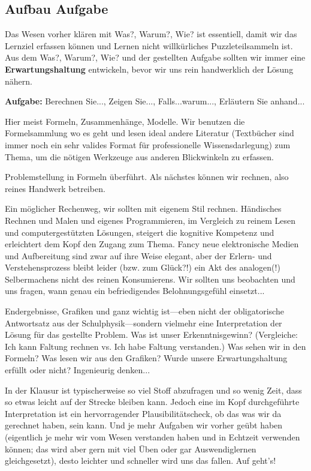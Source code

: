 \subsection*{Aufbau Aufgabe}
\begin{Ziel}
Das Wesen vorher klären mit Was?, Warum?, Wie? ist essentiell, damit wir das
Lernziel erfassen können und Lernen nicht willkürliches Puzzleteilsammeln ist.
Aus dem Was?, Warum?, Wie? und der gestellten Aufgabe sollten wir immer eine
\textbf{Erwartungshaltung} entwickeln, bevor wir uns rein handwerklich der Lösung nähern.
\end{Ziel}
\textbf{Aufgabe:} Berechnen Sie..., Zeigen Sie..., Falls...warum..., Erläutern
Sie anhand...
\begin{Werkzeug}
Hier meist Formeln, Zusammenhänge, Modelle. Wir benutzen die Formelsammlung
wo es geht und lesen ideal andere Literatur (Textbücher sind immer noch ein sehr
valides Format für professionelle Wissensdarlegung) zum Thema, um die nötigen
Werkzeuge aus anderen Blickwinkeln zu erfassen.
\end{Werkzeug}
\begin{Ansatz}
Problemstellung in Formeln überführt. Als nächstes können wir rechnen, also
reines Handwerk betreiben.
\end{Ansatz}
\begin{ExCalc}
Ein möglicher Rechenweg, wir sollten mit eigenem Stil
rechnen.
Händisches Rechnen und Malen und eigenes Programmieren, im Vergleich zu reinem
Lesen und computergestützten Lösungen, steigert die kognitive Kompetenz und
erleichtert dem Kopf den Zugang zum Thema.
%
Fancy neue elektronische Medien und Aufbereitung sind zwar auf ihre Weise elegant,
aber der Erlern- und Verstehensprozess bleibt leider (bzw. zum Glück?!) ein
Akt des analogen(!) Selbermachens nicht des reinen Konsumierens.
%
Wir sollten uns beobachten und uns fragen, wann genau ein
befriedigendes Belohnungsgefühl einsetzt...
%
\end{ExCalc}
\begin{Loesung}
Endergebnisse, Grafiken und ganz wichtig ist---eben nicht der obligatorische Antwortsatz
aus der Schulphysik---sondern vielmehr eine Interpretation der Lösung
für das gestellte Problem.
%
Was ist unser Erkenntnisgewinn?
%
(Vergleiche: Ich kann Faltung rechnen vs. Ich habe Faltung verstanden.)
%
Was sehen wir in den Formeln?
%
Was lesen wir aus den Grafiken?
%
Wurde unsere Erwartungshaltung erfüllt oder nicht? Ingenieurig denken...

In der Klausur ist typischerweise so viel Stoff abzufragen und so wenig Zeit,
dass so etwas leicht auf der Strecke bleiben kann. Jedoch eine im Kopf
durchgeführte Interpretation ist ein hervorragender Plausibilitätscheck, ob das was
wir da gerechnet haben, sein kann. Und je mehr Aufgaben wir
vorher geübt haben (eigentlich je mehr wir vom Wesen verstanden haben und in
Echtzeit verwenden können; das wird aber gern mit viel Üben oder gar
Auswendiglernen gleichgesetzt),
desto leichter und schneller wird uns das fallen.
%
Auf geht's!
\end{Loesung}

